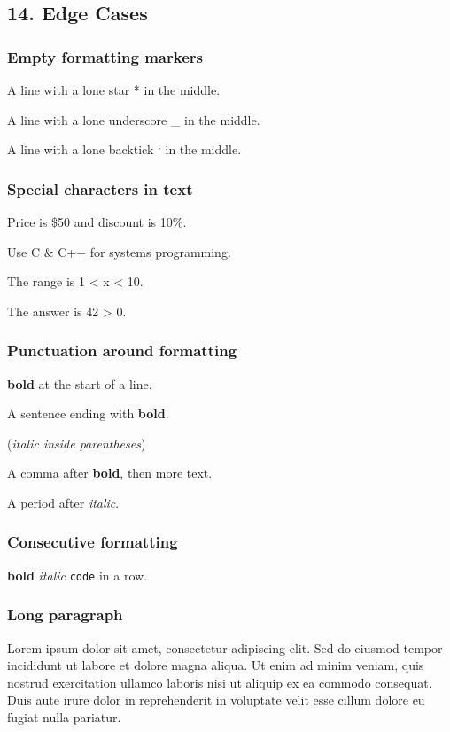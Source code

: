 \documentclass{article}
\begin{document}
\subsection{ 14. Edge Cases}

\subsubsection{ Empty formatting markers}

A line with a lone star * in the middle.

A line with a lone underscore \_ in the middle.

A line with a lone backtick ` in the middle.

\subsubsection{ Special characters in text}

Price is \$50 and discount is 10\%.

Use C \& C++ for systems programming.

The range is 1 < x < 10.

The answer is 42 > 0.

\subsubsection{ Punctuation around formatting}

\textbf{bold} at the start of a line.

A sentence ending with \textbf{bold}.

(\emph{italic inside parentheses})

A comma after \textbf{bold}, then more text.

A period after \emph{italic}.

\subsubsection{ Consecutive formatting}

\textbf{bold} \emph{italic} \texttt{code} in a row.

\subsubsection{ Long paragraph}

Lorem ipsum dolor sit amet, consectetur adipiscing elit. Sed do eiusmod tempor incididunt ut labore et dolore magna aliqua. Ut enim ad minim veniam, quis nostrud exercitation ullamco laboris nisi ut aliquip ex ea commodo consequat. Duis aute irure dolor in reprehenderit in voluptate velit esse cillum dolore eu fugiat nulla pariatur.
\end{document}
